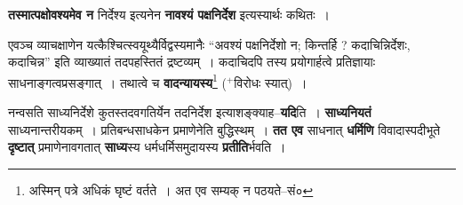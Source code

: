 \documentclass[article,12pt,a4paper]{memoir}
\newcommand{\add}[1]{($^{+}$#1)}
\begin{document}
	  \pstart \textbf{तस्मात्पक्षोवश्यमेव न} निर्देश्य इत्यनेन \textbf{नावश्यं पक्षनिर्देश} इत्यस्यार्थः कथितः ।
	\pend
      

	  \pstart एवञ्च व्याचक्षाणेन यत्कैश्चित्स्वयूथ्यैर्विद्वस्यमानैः “अवश्यं पक्षनिर्देशो न; किन्तर्हि ? कदाचिन्निर्देशः, कदाचिन्न” इति व्याख्यातं तदपहस्तितं द्रष्टव्यम् । कदाचिदपि तस्य प्रयोगार्हत्वे प्रतिज्ञायाः साधनाङ्गत्वप्रसङ्गात् । तथात्वे च \textbf{वादन्यायस्य}\leavevmode{}\footnote{अस्मिन् पत्रे अधिकं घृष्टं वर्तते । अत एव सम्यक् न पठयते--सं०} \add{विरोधः स्यात्} ।
	\pend
      

	  \pstart नन्वसति साध्यनिर्देशे कुतस्तदवगतिर्येन तदनिर्देश इत्याशङ्क्याह--\textbf{यदि}ति । \textbf{साध्यनियतं} साध्यनान्तरीयकम् । प्रतिबन्धसाधकेन प्रमाणेनेति बुद्धिस्थम् । \textbf{तत एव} साधनात् \textbf{धर्मिणि} विवादास्पदीभूते \textbf{दृष्टात्} प्रमाणेनावगतात् \textbf{साध्य}स्य धर्मधर्मिसमुदायस्य \textbf{प्रतीति}र्भवति ।
	\pend
      
\end{document}

